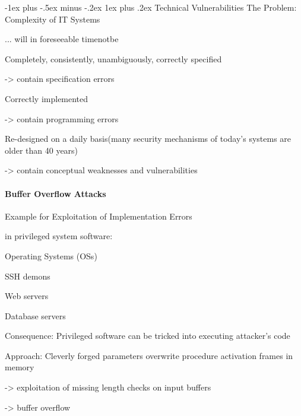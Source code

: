 \documentclass[a4paper]{article}
\makeatletter
\renewcommand{\subsubsection}{\@startsection{subsubsection}{3}{0mm}%
                                {-1ex plus -.5ex minus -.2ex}%
                                {1ex plus .2ex}%
                                {\normalfont\small\bfseries}}
\makeatother
\begin{document}
\begin{multicols}{3}
    \subsubsection{Technical Vulnerabilities}
    The Problem: Complexity of IT Systems
    \begin{itemize*}
        \item ... will in foreseeable timenotbe
        \item Completely, consistently, unambiguously, correctly specified
              \begin{itemize*}
                  \item ->  contain specification errors
              \end{itemize*}
        \item Correctly implemented
              \begin{itemize*}
                  \item ->  contain programming errors
              \end{itemize*}
        \item Re-designed on a daily basis(many security mechanisms of today’s systems are older than 40 years)
              \begin{itemize*}
                  \item ->  contain conceptual weaknesses and vulnerabilities
              \end{itemize*}
    \end{itemize*}

    \paragraph{Buffer Overflow Attacks}
    Example for Exploitation of Implementation Errors

    in privileged system software:
    \begin{itemize*}
        \item Operating Systems (OSs)
        \item SSH demons
        \item Web servers
        \item Database servers
    \end{itemize*}

    Consequence: Privileged software can be tricked into executing attacker’s code

    Approach: Cleverly forged parameters overwrite procedure activation frames in
    memory
    \begin{itemize*}
        \item ->  exploitation of missing length checks on input buffers
        \item -> buffer overflow
    \end{itemize*}


\end{multicols}
\end{document}
